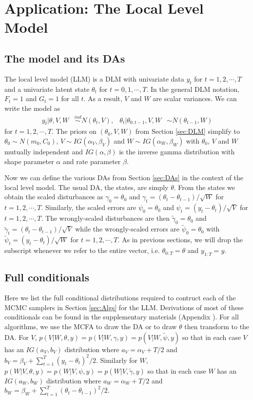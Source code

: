 \documentclass[12pt]{article}
\begin{document}
\section{Application: The Local Level Model}\label{sec:LLM}

\subsection{The model and its DAs}

The local level model (LLM) is a DLM with univariate data $y_t$ for $t=1,2,\cdots,T$ and a univariate latent state $\theta_t$ for $t=0,1,\cdots,T$. In the general DLM notation, $F_t=1$ and $G_t=1$ for all $t$. As a result, $V$ and $W$ are scalar variances. We can write the model as
\begin{align}
  y_t |\theta,V,W& \stackrel{ind}{\sim} N(\theta_t,V), &
  \theta_t |\theta_{0:t-1},V,W& \sim N(\theta_{t-1},W)
\end{align}
for $t=1,2,\cdots,T$. The priors on $(\theta_0,V,W)$ from Section \ref{sec:DLM} simplify to $\theta_0\sim N(m_0,C_0)$, $V\sim IG(\alpha_V,\beta_V)$ and $W\sim IG(\alpha_W,\beta_W)$ with $\theta_0$, $V$ and $W$ mutually independent and $IG(\alpha,\beta)$ is the inverse gamma distribution with shape parameter $\alpha$ and rate parameter $\beta$.

Now we can define the various DAs from Section \ref{sec:DAs} in the context of the local level model. The usual DA, the states, are simply $\theta$. From the states we obtain the scaled disturbances as $\gamma_0=\theta_0$ and $\gamma_t = (\theta_t - \theta_{t-1})/\sqrt{W}$ for $t=1,2,\cdots,T$. Similarly, the scaled errors are $\psi_0=\theta_0$ and $\psi_t = (y_t - \theta_t)/\sqrt{V}$ for $t=1,2,\cdots,T$. The wrongly-scaled disturbances are then $\tilde{\gamma}_{0}=\theta_0$ and $\tilde{\gamma}_t = (\theta_t - \theta_{t-1})/\sqrt{V}$ while the wrongly-scaled errors are $\tilde{\psi}_0=\theta_0$ with $\tilde{\psi}_t = (y_t - \theta_t)/\sqrt{W}$ for $t=1,2,\cdots,T$. As in previous sections, we will drop the subscript whenever we refer to the entire vector, i.e. $\theta_{0:T}=\theta$ and $y_{1:T}=y$.

\subsection{Full conditionals}\label{sec:LLM:fullcond}

Here we list the full conditional distributions required to contruct each of the MCMC samplers in Section \ref{sec:Algs} for the LLM. Derivations of most of these conditionals can be found in the supplementary materials (Appendix ). For all algorithms, we use the MCFA to draw the DA or to draw $\theta$ then transform to the DA. For $V$, $p(V|W,\theta,y)=p(V|W,\gamma,y)=p(V|W,\tilde{\psi},y)$ so that in each case $V$ has an $IG(a_V,b_V)$ distribution where $a_V = \alpha_V + T/2$ and $b_V = \beta_V + \sum_{t=1}^T(y_t - \theta_t)^2/2$. Similarly for $W$, $p(W|V,\theta,y)=p(W|V,\psi,y)=p(W|V,\tilde{\gamma},y)$ so that in each case $W$ has an $IG(a_W, b_W)$ distribution where $a_W = \alpha_W + T/2$ and $b_W = \beta_W + \sum_{t=1}^T(\theta_t - \theta_{t-1})^2/2$.
\end{document}
